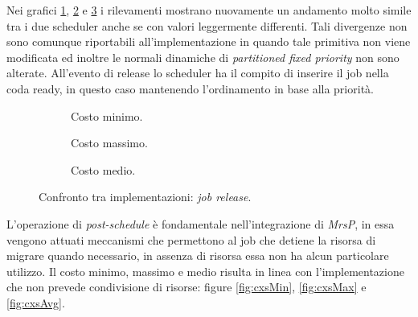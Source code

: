 \noindent Nei grafici \ref{fig:releaseMin}, \ref{fig:releaseMax} e \ref{fig:releaseAvg} i rilevamenti mostrano nuovamente un andamento molto simile tra i due scheduler anche se con valori leggermente differenti. Tali divergenze non sono comunque riportabili all'implementazione in quando tale primitiva non viene modificata ed inoltre le normali dinamiche di \textit{partitioned fixed priority} non sono alterate. All'evento di release lo scheduler ha il compito di inserire il job nella coda ready, in questo caso mantenendo l'ordinamento in base alla priorità.\\

  \begin{figure}[htb]
    \centering
      \begin{subfigure}[b]{0.49\textwidth}
        \centering
        \resizebox{\linewidth}{!}\graficoReleaseMIN  
        \caption{Costo minimo.}
        \label{fig:releaseMin}
      \end{subfigure}
      \begin{subfigure}[b]{0.49\textwidth}
        \centering
        \resizebox{\linewidth}{!}\graficoReleaseMAX
        \caption{Costo massimo.}
        \label{fig:releaseMax}
      \end{subfigure}
      \begin{subfigure}[b]{0.49\textwidth}
        \centering
        \resizebox{\linewidth}{!}\graficoReleaseAVG
        \caption{Costo medio.}
        \label{fig:releaseAvg}
      \end{subfigure}

    \caption{Confronto tra implementazioni: \textit{job release}.}
    \label{fig:release}
  \end{figure}
        
\noindent L'operazione di \textit{post-schedule} è fondamentale nell'integrazione di \textit{MrsP}, in essa vengono attuati meccanismi che permettono al job che detiene la risorsa di migrare quando necessario, in assenza di risorsa essa non ha alcun particolare utilizzo. Il costo minimo, massimo e medio risulta in linea con l'implementazione che non prevede condivisione di risorse: figure \ref{fig:cxsMin}, \ref{fig:cxsMax} e \ref{fig:cxsAvg}.\\

